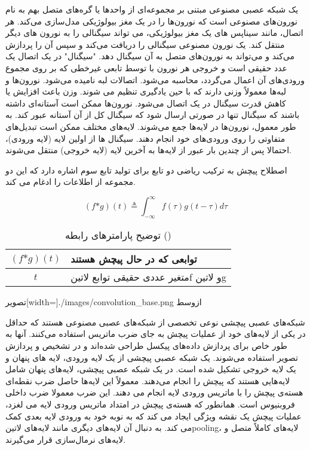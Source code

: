 
یک شبکه عصبی مصنوعی مبتنی بر مجموعه‌ای از واحدها یا گره‌های متصل بهم به نام نورون‌های مصنوعی است که نورون‌ها را در یک مغز بیولوژیکی مدل‌سازی می‌کند. هر اتصال، مانند سیناپس های یک مغز بیولوژیکی، می تواند سیگنالی را به نورون های دیگر منتقل کند. یک نورون مصنوعی سیگنالی را دریافت می‌کند و سپس آن را پردازش می‌کند و می‌تواند به نورون‌های متصل به آن سیگنال دهد. "سیگنال" در یک اتصال یک عدد حقیقی است و خروجی هر نورون با توسط تابعی غیرخطی که بر روی مجموع ورودی‌های آن اعمال می‌گردد، محاسبه می‌شود. اتصالات لبه نامیده می‌شود. نورون‌ها و لبه‌ها معمولاً وزنی دارند که با حین یادگیری تنظیم می شوند. وزن باعث افزایش یا کاهش قدرت سیگنال در یک اتصال می‌شود. نورون‌ها ممکن است آستانه‌ای داشته باشند که سیگنال تنها در صورتی ارسال شود که سیگنال کل از آن آستانه عبور کند. به طور معمول، نورون‌ها در لایه‌ها جمع می‌شوند. لایه‌های مختلف ممکن است تبدیل‌های متفاوتی را روی ورودی‌های خود انجام دهند. سیگنال ها از اولین لایه (لایه ورودی)، احتمالا پس از چندین بار عبور از لایه‌ها به آخرین لایه (لایه خروجی) منتقل می‌شوند.

اصطلاح پیچش به ترکیب ریاضی دو تابع برای تولید تابع سوم اشاره دارد که این دو مجموعه از اطلاعات را ادغام می کند.

\begin{equation}
  \label{eq:conv}
(f \text{*} g)(t) \triangleq \int_{-\infty}^\infty f(\tau)g(t - \tau)d\tau
\end{equation}


\begin{table}[h]
  \centering
  \caption{توضیح پارامترهای رابطه ()}
  \begin{tabular}{|c|p{}|}
    \hline
    $(f \text{*} g)(t)$ & توابعی که در حال پیچش هستند \\
    \hline
    $t$ & متغیر عددی حقیقی توابع ‌لاتین{f}  و ‌لاتین{g} \\
    \hline
  \end{tabular}
  \label{tbl:distance}
\end{table}


  ‌تصویر[width=\textwidth]{./images/convolution_base.png}
  ‌ازوسط

شبکه‌های عصبی پیچشی نوعی تخصصی از شبکه‌های عصبی مصنوعی هستند که حداقل در یکی از لایه‌های خود از عملیات پیچش به جای ضرب ماتریس استفاده می‌کنند. آنها به طور خاص برای پردازش داده‌های پیکسل طراحی شده‌اند و در تشخیص و پردازش تصویر استفاده می‌شوند. یک شبکه عصبی پیچشی از یک لایه ورودی، لایه های پنهان و یک لایه خروجی تشکیل شده است. در یک شبکه عصبی پیچشی، لایه‌های پنهان شامل لایه‌هایی هستند که پیچش را انجام می‌دهند. معمولاً این لایه‌ها حاصل ضرب نقطه‌ای هسته‌ی پیچش را با ماتریس ورودی لایه انجام می دهند. این ضرب معمولا ضرب داخلی فروبنیوس است. همانطور که هسته‌ی پیچش در امتداد ماتریس ورودی لایه می لغزد، عملیات پیچش یک نقشه ویژگی ایجاد می کند که به نوبه خود به ورودی لایه بعدی کمک می کند. به دنبال آن لایه‌های دیگری مانند لایه‌های ‌لاتین{pooling}، لایه‌های کاملاً متصل و لایه‌های نرمال‌سازی قرار می‌گیرند.


